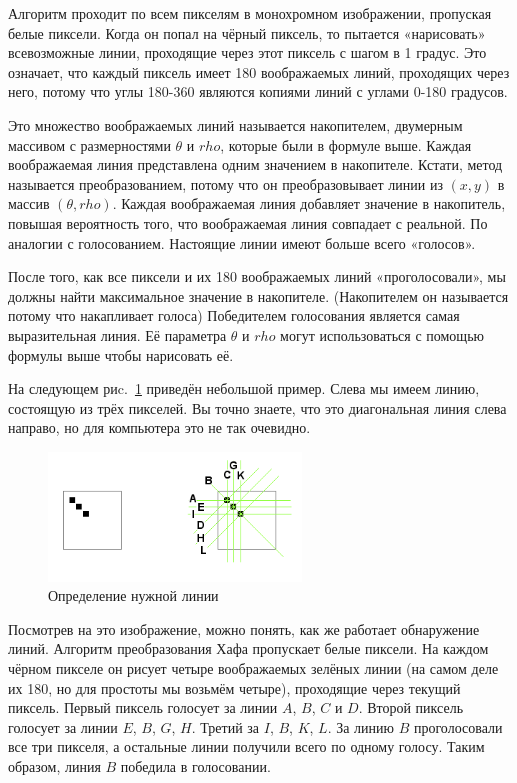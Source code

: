 Алгоритм проходит по всем пикселям в монохромном изображении, пропуская белые пиксели. Когда он попал на чёрный пиксель, то пытается «нарисовать» всевозможные линии, проходящие через этот пиксель с шагом в 1 градус. Это означает, что каждый пиксель имеет 180 воображаемых линий, проходящих через него, потому что углы 180-360 являются копиями линий с углами 0-180 градусов. 

Это множество воображаемых линий называется накопителем, двумерным массивом с размерностями $\theta$ и $rho$, которые были в формуле выше. Каждая воображаемая линия представлена одним значением в накопителе. Кстати, метод называется преобразованием, потому что он преобразовывает линии из $(x, y)$ в массив $(\theta, rho)$. Каждая воображаемая линия добавляет значение в накопитель, повышая вероятность того, что воображаемая линия совпадает с реальной. По аналогии с голосованием. Настоящие линии имеют больше всего «голосов». 

После того, как все пиксели и их 180 воображаемых линий «проголосовали», мы должны найти максимальное значение в накопителе. (Накопителем он называется потому что накапливает голоса) Победителем голосования является самая выразительная линия. Её параметра $\theta$ и $rho$ могут использоваться с помощью формулы выше чтобы нарисовать её. 

На следующем риc.~\ref{fig:fig26} приведён небольшой пример. Слева мы имеем линию, состоящую из трёх пикселей. Вы точно знаете, что это диагональная линия слева направо, но для компьютера это не так очевидно. 
\begin{figure}[ht!]
  \centering
  \includegraphics[width=0.6\textwidth]{inc/raster/design2-6.png}
  \caption{Определение нужной линии}
  \label{fig:fig26}
\end{figure}

Посмотрев на это изображение, можно понять, как же работает обнаружение линий. Алгоритм преобразования Хафа пропускает белые пиксели. На каждом чёрном пикселе он рисует четыре воображаемых зелёных линии (на самом деле их 180, но для простоты мы возьмём четыре), проходящие через текущий пиксель. Первый пиксель голосует за линии $A$, $B$, $C$ и $D$. Второй пиксель голосует за линии $E$, $B$, $G$, $H$. Третий за $I$, $B$, $K$, $L$. За линию $B$ проголосовали все три пикселя, а остальные линии получили всего по одному голосу. Таким образом, линия $B$ победила в голосовании.


